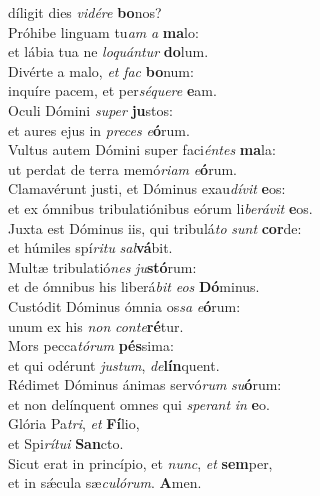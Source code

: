 \evenverse díligit dies \textit{vi}\textit{dé}\textit{re} \textbf{bo}nos?\\
\oddverse Próhibe linguam tu\textit{am} \textit{a} \textbf{ma}lo:~\*\\
\oddverse et lábia tua ne \textit{lo}\textit{quán}\textit{tur} \textbf{do}lum.\\
\evenverse Divérte a malo, \textit{et} \textit{fac} \textbf{bo}num:~\*\\
\evenverse inquíre pacem, et per\textit{sé}\textit{que}\textit{re} \textbf{e}am.\\
\oddverse Oculi Dómini \textit{su}\textit{per} \textbf{ju}stos:~\*\\
\oddverse et aures ejus in \textit{pre}\textit{ces} \textit{e}\textbf{ó}rum.\\
\evenverse Vultus autem Dómini super faci\textit{én}\textit{tes} \textbf{ma}la:~\*\\
\evenverse ut perdat de terra memó\textit{ri}\textit{am} \textit{e}\textbf{ó}rum.\\
\oddverse Clamavérunt justi, et Dóminus exau\textit{dí}\textit{vit} \textbf{e}os:~\*\\
\oddverse et ex ómnibus tribulatiónibus eórum li\textit{be}\textit{rá}\textit{vit} \textbf{e}os.\\
\evenverse Juxta est Dóminus iis, qui tribulá\textit{to} \textit{sunt} \textbf{cor}de:~\*\\
\evenverse et húmiles spí\textit{ri}\textit{tu} \textit{sal}\textbf{vá}bit.\\
\oddverse Multæ tribulatió\textit{nes} \textit{ju}\textbf{stó}rum:~\*\\
\oddverse et de ómnibus his liberá\textit{bit} \textit{e}\textit{os} \textbf{Dó}minus.\\
\evenverse Custódit Dóminus ómnia os\textit{sa} \textit{e}\textbf{ó}rum:~\*\\
\evenverse unum ex his \textit{non} \textit{con}\textit{te}\textbf{ré}tur.\\
\oddverse Mors pecca\textit{tó}\textit{rum} \textbf{pés}sima:~\*\\
\oddverse et qui odérunt \textit{ju}\textit{stum}, \textit{de}\textbf{lín}quent.\\
\evenverse Rédimet Dóminus ánimas servó\textit{rum} \textit{su}\textbf{ó}rum:~\*\\
\evenverse et non delínquent omnes qui \textit{spe}\textit{rant} \textit{in} \textbf{e}o.\\
\oddverse Glória Pa\textit{tri}, \textit{et} \textbf{Fí}lio,~\*\\
\oddverse et Spi\textit{rí}\textit{tu}\textit{i} \textbf{San}cto.\\
\evenverse Sicut erat in princípio, et \textit{nunc}, \textit{et} \textbf{sem}per,~\*\\
\evenverse et in sǽcula sæ\textit{cu}\textit{ló}\textit{rum}. \textbf{A}men.\\
